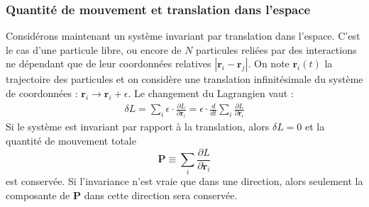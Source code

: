 \subsubsection{Quantité de mouvement et translation dans l'espace}
Considérons maintenant un système invariant par translation dans l'espace. C'est le cas d'une particule libre, ou encore de $N$ particules reliées par des interactions ne dépendant que de leur coordonnées relatives $\left|\bm{r}_i-\bm{r}_j\right|$. 
On note $\bm{r}_i(t)$ la trajectoire des particules et on considère une translation infinitésimale du système de coordonnées : $\bm{r}_i\rightarrow \bm{r}_i+\epsilon$. Le changement du Lagrangien vaut :
\begin{align*}
\delta L =\sum_i \epsilon\cdot\frac{\partial L}{\partial \bm{r}_i}= \epsilon\cdot\frac{d}{dt}\sum_i \frac{\partial L}{\partial {\dot{\bm{r}}}_i}
\end{align*}
Si le système est invariant par rapport à la translation, alors $\delta L=0$ et la quantité de mouvement totale
\begin{equation*}
\bm{P}\equiv\sum_i\frac{\partial L}{\partial \dot{\bm{r}}_i}
\end{equation*}
est conservée. Si l'invariance n'est vraie que dans une direction, alors seulement la composante de $\bm{P}$ dans cette direction sera conservée.


